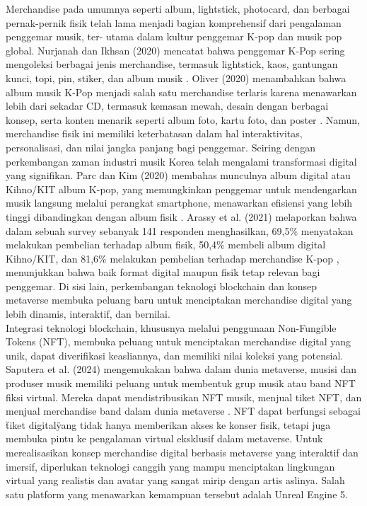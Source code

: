 Merchandise pada umumnya seperti album, lightstick, photocard, dan berbagai pernak-pernik fisik telah lama menjadi bagian
komprehensif dari pengalaman penggemar musik, ter- utama dalam kultur penggemar K-pop dan musik pop global. Nurjanah dan
Ikhsan (2020) mencatat bahwa penggemar K-Pop sering mengoleksi berbagai jenis merchandise, termasuk lightstick, kaos,
gantungan kunci, topi, pin, stiker, dan album musik \parencite{Nurjanah2020}. Oliver (2020) menambahkan bahwa album musik K-Pop menjadi 
salah satu merchandise terlaris karena menawarkan lebih dari sekadar CD, termasuk kemasan mewah, desain dengan berbagai
konsep, serta konten menarik seperti album foto, kartu foto, dan poster \parencite{Oliver2020}. Namun, merchandise fisik ini memiliki 
keterbatasan dalam hal interaktivitas, personalisasi, dan nilai jangka panjang bagi penggemar. Seiring dengan perkembangan
zaman industri musik Korea telah mengalami transformasi digital yang signifikan. Parc dan Kim (2020) membahas 
munculnya album digital atau Kihno/KIT album K-pop, yang memungkinkan penggemar untuk mendengarkan musik langsung melalui
perangkat smartphone, menawarkan efisiensi yang lebih tinggi dibandingkan dengan album fisik \parencite{Arassy2021}. Arassy et al. (2021)
melaporkan bahwa dalam sebuah survey sebanyak 141 responden menghasilkan, 69,5\% menyatakan melakukan pembelian terhadap
album fisik, 50,4\% membeli album digital Kihno/KIT, dan 81,6\% melakukan pembelian terhadap merchandise K-pop \parencite{Saputera2024},
menunjukkan bahwa baik format digital maupun fisik tetap relevan bagi penggemar. Di sisi lain, perkembangan teknologi
blockchain dan konsep metaverse membuka peluang baru untuk menciptakan merchandise digital yang lebih dinamis, interaktif,
dan bernilai.
\\

Integrasi teknologi blockchain, khususnya melalui penggunaan Non-Fungible Tokens (NFT), membuka peluang untuk menciptakan 
merchandise digital yang unik, dapat diverifikasi keasliannya, dan memiliki nilai koleksi yang potensial. Saputera et al.
(2024) mengemukakan bahwa dalam dunia metaverse, musisi dan produser musik memiliki peluang untuk membentuk grup musik 
atau band NFT fiksi virtual. Mereka dapat mendistribusikan NFT musik, menjual tiket NFT, dan menjual merchandise band 
dalam dunia metaverse \parencite{EpicGames2022}. NFT dapat berfungsi sebagai \"tiket digital\" yang tidak hanya memberikan akses ke konser fisik,
tetapi juga membuka pintu ke pengalaman virtual eksklusif dalam metaverse. Untuk merealisasikan konsep merchandise digital
berbasis metaverse yang interaktif dan imersif, diperlukan teknologi canggih yang mampu menciptakan lingkungan virtual 
yang realistis dan avatar yang sangat mirip dengan artis aslinya. Salah satu platform yang menawarkan kemampuan tersebut
adalah Unreal Engine 5.
\\

